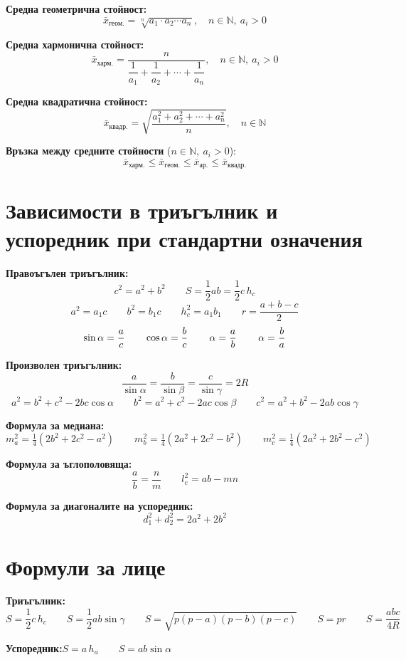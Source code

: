 \documentclass[12pt,a4paper]{article}
\let\tg\relax
\let\cotg\relax
\newcommand{\tg}{\operatorname{tg}}%
\newcommand{\cotg}{\operatorname{cotg}}%
\begin{document}
\textbf{Средна геометрична стойност:}
$$\bar{x}_{\text{геом.}} = \sqrt[n]{a_1 \cdot a_2 \cdots a_n},\quad n \in \mathbb{N},\ a_i > 0$$

\textbf{Средна хармонична стойност:}
$$\bar{x}_{\text{харм.}} = \frac{n}{\dfrac{1}{a_1} + \dfrac{1}{a_2} + \cdots + \dfrac{1}{a_n}},\quad n \in \mathbb{N},\ a_i > 0$$

\textbf{Средна квадратична стойност:}
$$\bar{x}_{\text{квадр.}} = \sqrt{\frac{a_1^2 + a_2^2 + \cdots + a_n^2}{n}},\quad n \in \mathbb{N}$$

\textbf{Връзка между средните стойности} ($n \in \mathbb{N},\ a_i > 0$):
$$\bar{x}_{\text{харм.}} \leq \bar{x}_{\text{геом.}} \leq \bar{x}_{\text{ар.}} \leq \bar{x}_{\text{квадр.}}$$

\newpage
\section{Зависимости в триъгълник и успоредник при стандартни означения}

\textbf{Правоъгълен триъгълник:}
$$c^2 = a^2 + b^2 \qquad S = \frac{1}{2}ab = \frac{1}{2}c\,h_c$$
$$a^2 = a_1 c \qquad b^2 = b_1 c \qquad h_c^2 = a_1 b_1 \qquad r = \frac{a + b - c}{2}$$
$$\sin\alpha = \frac{a}{c} \qquad \cos\alpha = \frac{b}{c} \qquad \tg\,\alpha = \frac{a}{b} \qquad \cotg\,\alpha = \frac{b}{a}$$

\textbf{Произволен триъгълник:}
$$\frac{a}{\sin\alpha} = \frac{b}{\sin\beta} = \frac{c}{\sin\gamma} = 2R$$
$$a^2 = b^2 + c^2 - 2bc\cos\alpha \qquad b^2 = a^2 + c^2 - 2ac\cos\beta \qquad c^2 = a^2 + b^2 - 2ab\cos\gamma$$

\textbf{Формула за медиана:}
$$m_a^2 = \tfrac{1}{4}(2b^2 + 2c^2 - a^2) \qquad m_b^2 = \tfrac{1}{4}(2a^2 + 2c^2 - b^2) \qquad m_c^2 = \tfrac{1}{4}(2a^2 + 2b^2 - c^2)$$

\textbf{Формула за ъглополовяща:}
$$\frac{a}{b} = \frac{n}{m} \qquad l_c^2 = ab - mn$$

\textbf{Формула за диагоналите на успоредник:}
$$d_1^2 + d_2^2 = 2a^2 + 2b^2$$

\section{Формули за лице}

\textbf{Триъгълник:}
$$S = \frac{1}{2}c\,h_c \qquad S = \frac{1}{2}ab\sin\gamma \qquad S = \sqrt{p(p-a)(p-b)(p-c)} \qquad S = pr \qquad S = \frac{abc}{4R}$$

\textbf{Успоредник:}\quad $S = a\,h_a \qquad S = ab\sin\alpha$
\end{document}
